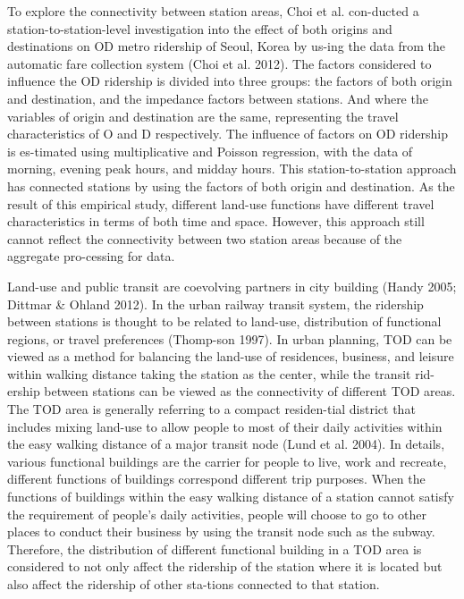 To explore the connectivity between station areas, Choi et al. con-ducted a station-to-station-level investigation into the effect of both origins and destinations on OD metro ridership of Seoul, Korea by us-ing the data from the automatic fare collection system (Choi et al. 2012). The factors considered to influence the OD ridership is divided into three groups: the factors of both origin and destination, and the impedance factors between stations. And where the variables of origin and destination are the same, representing the travel characteristics of O and D respectively. The influence of factors on OD ridership is es-timated using multiplicative and Poisson regression, with the data of morning, evening peak hours, and midday hours. This station-to-station approach has connected stations by using the factors of both origin and destination. As the result of this empirical study, different land-use functions have different travel characteristics in terms of both time and space. However, this approach still cannot reflect the connectivity between two station areas because of the aggregate pro-cessing for data.

Land-use and public transit are coevolving partners in city building (Handy 2005; Dittmar \& Ohland 2012). In the urban railway transit system, the ridership between stations is thought to be related to land-use, distribution of functional regions, or travel preferences (Thomp-son 1997). In urban planning, TOD can be viewed as a method for balancing the land-use of residences, business, and leisure within walking distance taking the station as the center, while the transit rid-ership between stations can be viewed as the connectivity of different TOD areas. The TOD area is generally referring to a compact residen-tial district that includes mixing land-use to allow people to most of their daily activities within the easy walking distance of a major transit node (Lund et al. 2004). In details, various functional buildings are the carrier for people to live, work and recreate, different functions of buildings correspond different trip purposes. When the functions of buildings within the easy walking distance of a station cannot satisfy the requirement of people’s daily activities, people will choose to go to other places to conduct their business by using the transit node such as the subway. Therefore, the distribution of different functional building in a TOD area is considered to not only affect the ridership of the station where it is located but also affect the ridership of other sta-tions connected to that station.

